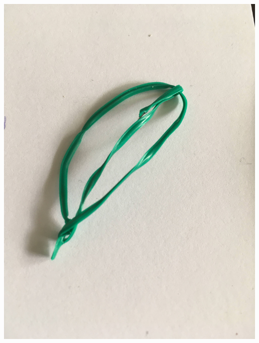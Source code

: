\documentclass[12pt, letter]{article}
\begin{document}
\includegraphics[width=\textwidth,height=\textheight,keepaspectratio]{leaf-gardenwire.jpg}
\newpage
\end{document}

